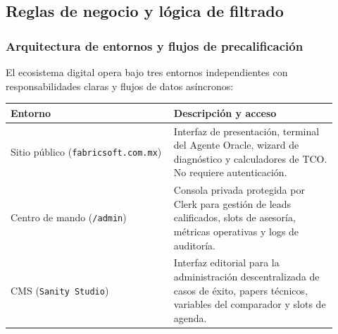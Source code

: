 \documentclass[11pt,letterpaper]{article}
\begin{document}
\subsection{Reglas de negocio y lógica de filtrado}

\subsubsection{Arquitectura de entornos y flujos de precalificación}
El ecosistema digital opera bajo tres entornos independientes con responsabilidades claras y flujos de datos asíncronos:
\begin{longtable}{p{0.46\linewidth}p{0.46\linewidth}}
\toprule
\textbf{Entorno} & \textbf{Descripción y acceso} \\
\midrule
Sitio público (\texttt{fabricsoft.com.mx}) & Interfaz de presentación, terminal del Agente Oracle, wizard de diagnóstico y calculadores de TCO. No requiere autenticación. \\
Centro de mando (\texttt{/admin}) & Consola privada protegida por Clerk para gestión de leads calificados, slots de asesoría, métricas operativas y logs de auditoría. \\
CMS (\texttt{Sanity Studio}) & Interfaz editorial para la administración descentralizada de casos de éxito, papers técnicos, variables del comparador y slots de agenda. \\
\bottomrule
\end{longtable}
\end{document}
